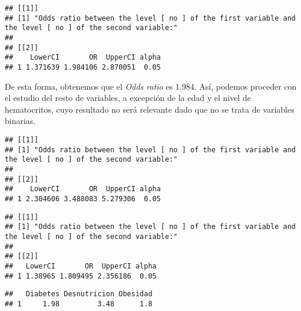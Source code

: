 \documentclass[]{article}
\newenvironment{Shaded}{\begin{snugshade}}{\end{snugshade}}
\newcommand{\KeywordTok}[1]{\textcolor[rgb]{0.13,0.29,0.53}{\textbf{#1}}}
\newcommand{\NormalTok}[1]{#1}
\newcommand{\OperatorTok}[1]{\textcolor[rgb]{0.81,0.36,0.00}{\textbf{#1}}}
\begin{document}
\begin{Shaded}
\end{Shaded}

\begin{verbatim}
## [[1]]
## [1] "Odds ratio between the level [ no ] of the first variable and the level [ no ] of the second variable:"
## 
## [[2]]
##    LowerCI       OR  UpperCI alpha
## 1 1.371639 1.984106 2.870051  0.05
\end{verbatim}

De esta forma, obtenemos que el \emph{Odds ratio} es 1.984. Así, podemos
proceder con el estudio del resto de variables, a excepción de la edad y
el nivel de hematocritos, cuyo resultado no será relevante dado que no
se trata de variables binarias.

\begin{Shaded}
\end{Shaded}

\begin{verbatim}
## [[1]]
## [1] "Odds ratio between the level [ no ] of the first variable and the level [ no ] of the second variable:"
## 
## [[2]]
##    LowerCI       OR  UpperCI alpha
## 1 2.304606 3.488083 5.279306  0.05
\end{verbatim}

\begin{Shaded}
\end{Shaded}

\begin{verbatim}
## [[1]]
## [1] "Odds ratio between the level [ no ] of the first variable and the level [ no ] of the second variable:"
## 
## [[2]]
##   LowerCI       OR  UpperCI alpha
## 1 1.38965 1.809495 2.356186  0.05
\end{verbatim}

\begin{verbatim}
##   Diabetes Desnutricion Obesidad
## 1     1.98         3.48      1.8
\end{verbatim}
\end{document}
